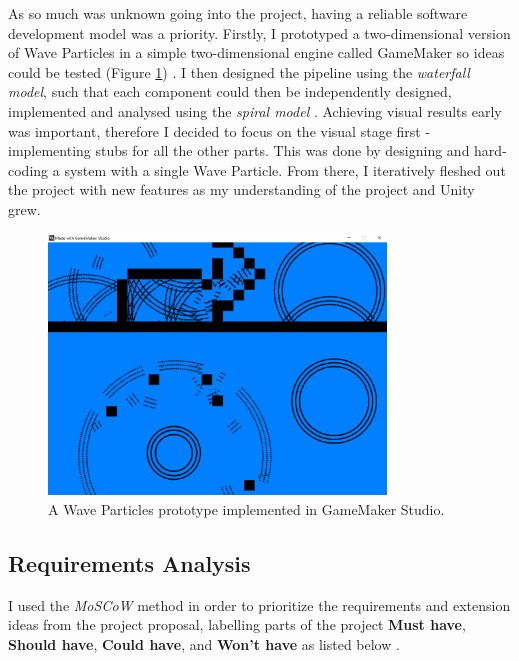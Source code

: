 \documentclass[12pt,a4paper,twoside]{report}
\begin{document}
As so much was unknown going into the project, having a reliable software
development model was a priority. Firstly, I prototyped a two-dimensional
version of Wave Particles in a simple two-dimensional engine called GameMaker
so ideas could be tested (Figure \ref{fig:wave_particles_prototype})
\cite{GameMakerStudio}. I then designed the pipeline using the
\textit{waterfall model}, such that each component could then be independently
designed, implemented and analysed using the \textit{spiral model}
\cite{WaterfallModel} \cite{SpiralModel}. Achieving visual results early was
important, therefore I decided to focus on the visual stage first -
implementing stubs for all the other parts. This was done by designing and
hard-coding a system with a single Wave Particle. From there, I iteratively
fleshed out the project with new features as my understanding of the project
and Unity grew.

\begin{figure}[h]
\centering
\includegraphics[width=0.8\textwidth]{wave_particles_prototype}
\caption{A Wave Particles prototype implemented in GameMaker Studio.}
\label{fig:wave_particles_prototype}
\end{figure}

\subsection{Requirements Analysis}

I used the \textit{MoSCoW} method in order to prioritize the requirements and
extension ideas from the project proposal, labelling parts of the project
\textbf{Must have}, \textbf{Should have}, \textbf{Could have}, and
\textbf{Won't have} as listed below \cite{MoSCoWMethod}.
\end{document}
